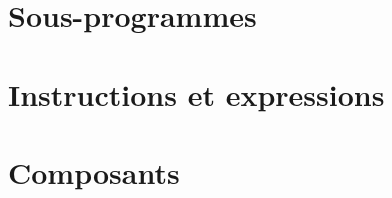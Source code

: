 \documentclass [a4paper, 11pt] {book}
\begin{document}
\part{Sous-programmes}













\part{Instructions et expressions}









\part{Composants}
















\end{document}
